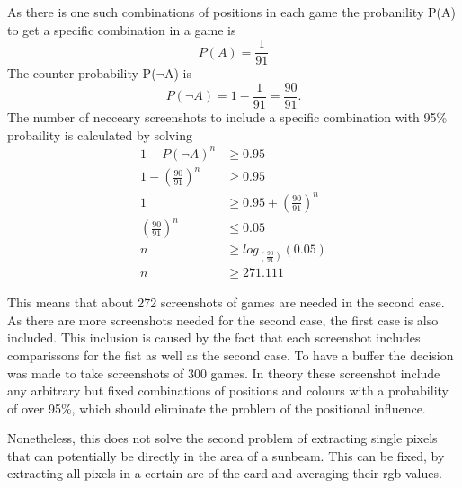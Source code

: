 \begin{center}
	As there is one such combinations of positions in each game the probanility P(A) to get a specific combination in a game is 
	\begin{equation*}
	P(A) = \frac{1}{91} %
	\end{equation*}
	The counter probability P($\lnot$A) is 
	\begin{equation*}
	P(\lnot A) = 1 - \frac{1}{91} = \frac{90}{91}.%
	\end{equation*}
	The number of necceary screenshots to include a specific combination with 95\% probaility is calculated by solving
	\begin{align*}
	1 - P(\lnot A)^n &\geq 0.95 \\
	1 - \left(\frac{90}{91}\right)^n &\geq 0.95 \\
	1 &\geq 0.95 + \left(\frac{90}{91}\right)^n\\
	\left(\frac{90}{91}\right)^n &\leq 0.05\\
	n &\geq log_{(\frac{90}{91})}(0.05) \\
	n &\geq 271.111 %
	\end{align*}
\end{center}
This means that about 272 screenshots of games are needed in the second case. As there are more screenshots needed for the second case, the first case is also included. This inclusion is caused by the fact that each screenshot includes comparissons for the  fist  as well as the second case. To have a buffer the decision was made to take screenshots of 300 games. In theory these screenshot include any arbitrary but fixed combinations of positions and colours with a probability of over 95\%, which should eliminate the problem of the positional influence.

Nonetheless, this does not solve the second problem of extracting single pixels that can potentially be directly in the area of a sunbeam. This can be fixed, by extracting all pixels in a certain are of the card and averaging their rgb values.  %

